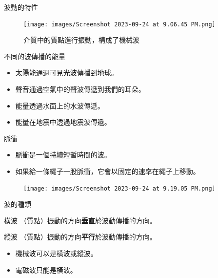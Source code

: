 \documentclass[13pt]{beamer}
\begin{document}
\begin{frame}{波動的特性}
    \begin{figure}
        \centering
        \texttt{[image: images/Screenshot 2023-09-24 at 9.06.45 PM.png]}
        \caption{介質中的質點進行振動，構成了機械波}

    \end{figure}
\end{frame}

\begin{frame}{不同的波傳播的能量}
    \begin{itemize}
        \item 太陽能通過可見光波傳播到地球。
        \item 聲音通過空氣中的聲波傳遞到我們的耳朵。
        \item 能量透過水面上的水波傳遞。
        \item 能量在地震中透過地震波傳遞。

    \end{itemize}
\end{frame}

\begin{frame}{脈衝}

    \begin{itemize}
        \item 脈衝是一個持續短暫時間的波。
        \item 如果給一條繩子一股脈衝，它會以固定的速率在繩子上移動。
    \end{itemize}
    \bigskip
    \begin{figure}
        \centering
        \texttt{[image: images/Screenshot 2023-09-24 at 9.19.05 PM.png]}


    \end{figure}
\end{frame}

\begin{frame}{波的種類}
    \begin{alertblock}{橫波}
        （質點）振動的方向\textbf{垂直}於波動傳播的方向。
    \end{alertblock}
    \begin{alertblock}{縱波}
        （質點）振動的方向\textbf{平行}於波動傳播的方向。
    \end{alertblock}
    \begin{itemize}
        \item 機械波可以是橫波或縱波。
        \item 電磁波只能是橫波。
    \end{itemize}
\end{frame}
\end{document}
